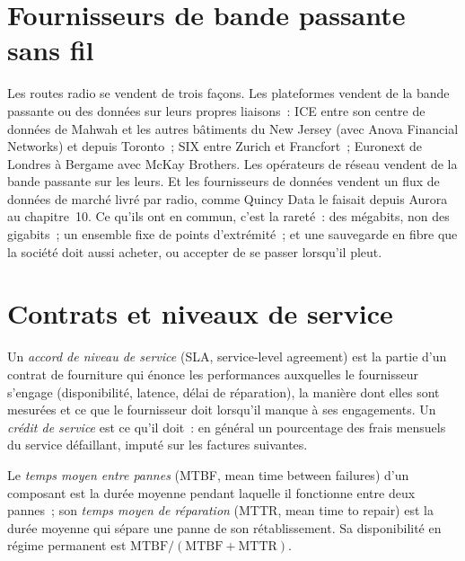 \section{Fournisseurs de bande passante sans fil}

Les routes radio se vendent de trois façons. Les plateformes vendent de la bande passante ou des données sur leurs propres liaisons~: ICE entre son centre de données de Mahwah et les autres bâtiments du New
Jersey (avec Anova Financial Networks) et depuis Toronto~; SIX entre Zurich et Francfort~; Euronext de Londres à Bergame avec
McKay Brothers. Les opérateurs de réseau vendent de la bande passante sur les leurs. Et les fournisseurs de données vendent un flux de données de marché livré par radio, comme Quincy Data le faisait
depuis Aurora au chapitre~10. Ce qu'ils ont en commun, c'est la rareté~: des mégabits, non des gigabits~; un ensemble fixe de points d'extrémité~; et une sauvegarde en fibre que
la société doit aussi acheter, ou accepter de se passer lorsqu'il pleut.

\section{Contrats et niveaux de service}

\begin{definition}\label{def:nw:buying-connectivity:sla}
Un \emph{accord de niveau de service} (SLA, service-level agreement) est la partie d'un contrat de fourniture qui énonce les performances auxquelles le fournisseur
s'engage (disponibilité, latence, délai de réparation), la manière dont elles sont mesurées et ce que le fournisseur doit lorsqu'il manque à ses engagements. Un
\emph{crédit de service} est ce qu'il doit~: en général un pourcentage des frais mensuels du service défaillant, imputé sur les factures suivantes.
\end{definition}

\begin{definition}\label{def:nw:buying-connectivity:mtbf}
Le \emph{temps moyen entre pannes} (MTBF, mean time between failures) d'un composant est la durée moyenne pendant laquelle il fonctionne entre deux pannes~; son
\emph{temps moyen de réparation} (MTTR, mean time to repair) est la durée moyenne qui sépare une panne de son rétablissement. Sa disponibilité en régime permanent est
$\mathrm{MTBF}/(\mathrm{MTBF}+\mathrm{MTTR})$.
\end{definition}

